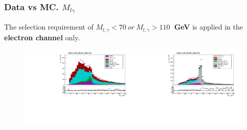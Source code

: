 \begin{frame}\frametitle{Data vs MC. $M_{l\gamma}$}
\scriptsize
The selection requirement of {\bfseries{$M_{l,\gamma}<70~or~M_{l,\gamma}>110$~GeV}} is applied in the {\bfseries{electron channel}} only.
\begin{figure}[htb]
  \begin{center}
   \includegraphics[width=0.5\textwidth]{../figs/figs_v11/MUON_WGamma/PrepareYields/c_TotalDATAvsMC_EtaCommon__Mpholep1_pt15to500_.pdf}\includegraphics[width=0.5\textwidth]{../figs/figs_v11/ELECTRON_WGamma/PrepareYields/c_TotalDATAvsMC_EtaCommon__Mpholep1PRELIMINARY_FOR_E_TO_GAMMA_WITH_PSV_CUT_pt15to500_.pdf}
  \label{fig:DATAvsMC_WMt}
  \end{center}
\end{figure}
\end{frame}
